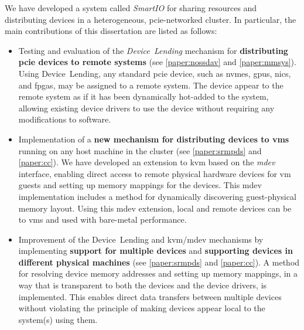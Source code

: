 We have developed a system called \emph{SmartIO} for sharing resources and distributing devices in a heterogeneous, \gls{pcie}-networked cluster.
%
In particular, the main contributions of this dissertation are listed as follows:
\begin{itemize}
    \item Testing and evaluation of the \emph{Device~Lending} mechanism for \textbf{distributing \gls{pcie} devices to remote systems} (see \cref{paper:nossdav} and \cref{paper:mmsys}). Using Device~Lending, any standard \gls{pcie} device, such as \glspl{nvme}, \glspl{gpu}, \glspl{nic}, and \glspl{fpga}, may be assigned to a remote system. The device appear to the remote system as if it has been dynamically hot-added to the system, allowing existing device drivers to use the device without requiring any modifications to software.

    \item Implementation of a \textbf{new mechanism for distributing devices to \glspl{vm}} running on any host machine in the cluster (see \cref{paper:srmpds} and \cref{paper:cc}). We have developed an extension to \gls{kvm} based on the \emph{\gls{mdev}} interface, enabling direct access to remote physical hardware devices for \gls{vm} guests and setting up memory mappings for the devices. This \gls{mdev} implementation includes a method for dynamically discovering guest-physical memory layout. Using this \gls{mdev} extension, local and remote devices can be  to \glspl{vm} and used with bare-metal performance.
	
    \item Improvement of the Device~Lending and \gls{kvm}/\gls{mdev} mechanisms by implementing \textbf{support for multiple devices} and \textbf{supporting devices in different physical machines} (see \cref{paper:srmpds} and \cref{paper:cc}). A method for resolving device memory addresses and setting up memory mappings, in a way that is transparent to both the devices and the device drivers, is implemented. This enables direct data transfers between multiple devices without violating the principle of making devices appear local to the system(s) using them.


\end{itemize}
